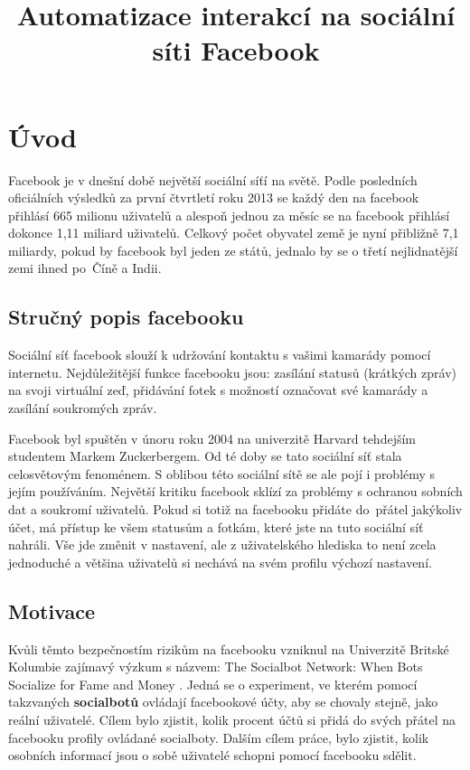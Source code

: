 \documentclass[thesis=M,czech]{FITthesis}[2013/05/10]
\title{Automatizace interakcí na sociální síti Facebook}
\begin{document}


\chapter{{\' U}vod}

Facebook je v dnešní době největší sociální síťí na světě. Podle posledních oficiálních výsledků \cite{web:fbMonthlyActiveUsers} za první čtvrtletí roku 2013 se každý den na facebook přihlásí 665 milionu uživatelů a alespoň jednou za měsíc se na facebook přihlásí dokonce 1,11 miliard uživatelů. Celkový počet obyvatel země je nyní přibližně 7,1 miliardy, pokud by facebook byl jeden ze států, jednalo by se o třetí nejlidnatější zemi ihned po~Číně a Indii.

\section{Stručný popis facebooku}

Sociální síť facebook slouží k udržování kontaktu s vašimi kamarády pomocí internetu. Nejdůležitější funkce facebooku jsou: zasílání statusů (krátkých zpráv) na svoji virtuální zeď, přidávání fotek s možností označovat své kamarády a zasílání soukromých zpráv.

Facebook byl spuštěn v únoru roku 2004 na univerzitě Harvard tehdejším studentem Markem Zuckerbergem. Od té doby se tato sociální síť stala celosvětovým fenoménem. S oblibou této sociální sítě se ale pojí i problémy s jejím používáním. Největší kritiku facebook sklízí za problémy s ochranou sobních dat a soukromí uživatelů. Pokud si totiž na facebooku přidáte do~přátel jakýkoliv účet, má přístup ke všem statusům a fotkám, které jste na tuto sociální síť nahráli. Vše jde změnit v nastavení, ale z uživatelského hlediska to není zcela jednoduché a většina uživatelů si nechává na svém profilu výchozí nastavení.

\section{Motivace}

Kvůli těmto bezpečnostím rizikům na facebooku vzniknul na Univerzitě Britské Kolumbie zajímavý výzkum s názvem: The Socialbot Network:
When Bots Socialize for Fame and Money \cite{web:socialbotNetwork}. Jedná se o experiment, ve kterém pomocí takzvaných \textbf{socialbotů} ovládají facebookové účty, aby se chovaly stejně, jako reální uživatelé. Cílem bylo zjistit, kolik procent účtů si přidá do svých přátel na facebooku profily ovládané socialboty. Dalším cílem práce, bylo zjistit, kolik osobních informací jsou o sobě uživatelé schopni pomocí facebooku sdělit.
\end{document}
